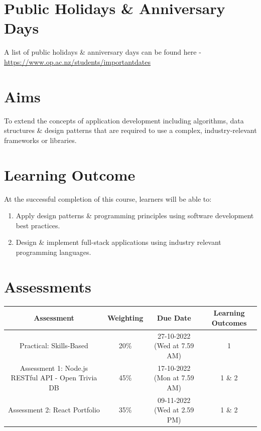 \documentclass{article}
\begin{document}
\section*{Public Holidays \& Anniversary Days}
A list of public holidays \& anniversary days can be found here - \href{https://www.op.ac.nz/students/importantdates}{https://www.op.ac.nz/students/importantdates}

\section*{Aims}
To extend the concepts of application development including algorithms, data structures \& design patterns that are required to use a complex, industry-relevant frameworks or libraries.

\section*{Learning Outcome}
At the successful completion of this course, learners will be able to:
\begin{enumerate}
	\item Apply design patterns \& programming principles using software development best practices.
	\item Design \& implement full-stack applications using industry relevant programming languages.
\end{enumerate}

\section*{Assessments}
\renewcommand{\arraystretch}{1.5}
\begin{tabular}{|c|c|c|c|}
	\hline
	\textbf{Assessment}                                 & \textbf{Weighting} & \textbf{Due Date}            & \textbf{Learning Outcomes} \\ \hline
	\small Practical: Skills-Based & \small 20\%        & \small 27-10-2022 (Wed at 7.59 AM)   & \small 1                   \\ \hline
	\small Assessment 1: Node.js RESTful API - Open Trivia DB              & \small 45\%        & \small 17-10-2022 (Mon at 7.59 AM)  & \small 1 \& 2                   \\ \hline
	\small Assessment 2: React Portfolio                       & \small 35\%        & \small 09-11-2022 (Wed at 2.59 PM)  & \small 1 \& 2                   \\ \hline
\end{tabular}
\end{document}
